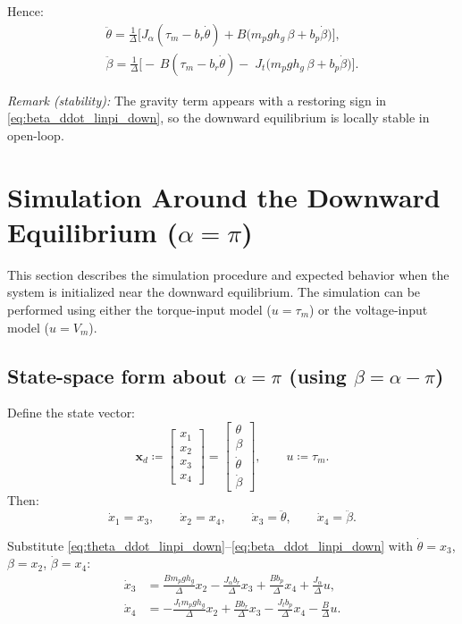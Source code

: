 \documentclass[12pt,a4paper]{article}
\begin{document}
Hence:
\begin{align}
\boxed{
\ddot\theta
=
\frac{1}{\Delta}\Big[
J_\alpha(\tau_m-b_r\dot\theta)
+
B\big(m_p g h_g\,\beta + b_p\dot\beta\big)
\Big],
}
\label{eq:theta_ddot_linpi_down}\\[6pt]
\boxed{
\ddot\beta
=
\frac{1}{\Delta}\Big[
-\,B(\tau_m-b_r\dot\theta)
-\;J_t\big(m_p g h_g\,\beta + b_p\dot\beta\big)
\Big].
}
\label{eq:beta_ddot_linpi_down}
\end{align}

\noindent\textit{Remark (stability):}
The gravity term appears with a restoring sign in \eqref{eq:beta_ddot_linpi_down}, so the downward equilibrium is locally stable in open-loop.

\section{Simulation Around the Downward Equilibrium ($\alpha=\pi$)}

This section describes the simulation procedure and expected behavior when the system is initialized near the downward equilibrium. The simulation can be performed using either the torque-input model ($u=\tau_m$) or the voltage-input model ($u=V_m$).

\subsection{State-space form about $\alpha=\pi$ (using $\beta=\alpha-\pi$)}

Define the state vector:
\[
\bm x_d \coloneqq
\begin{bmatrix}
x_1\\x_2\\x_3\\x_4
\end{bmatrix}
=
\begin{bmatrix}
\theta\\ \beta\\ \dot\theta\\ \dot\beta
\end{bmatrix},
\qquad
u\coloneqq\tau_m.
\]
Then:
\[
\dot x_1=x_3,\qquad \dot x_2=x_4,
\qquad
\dot x_3=\ddot\theta,\qquad \dot x_4=\ddot\beta.
\]

Substitute \eqref{eq:theta_ddot_linpi_down}--\eqref{eq:beta_ddot_linpi_down} with
$\dot\theta=x_3$, $\beta=x_2$, $\dot\beta=x_4$:
\begin{align*}
\dot x_3 &=
\frac{B m_p g h_g}{\Delta}x_2
-\frac{J_\alpha b_r}{\Delta}x_3
+\frac{B b_p}{\Delta}x_4
+\frac{J_\alpha}{\Delta}u,\\[4pt]
\dot x_4 &=
-\frac{J_t m_p g h_g}{\Delta}x_2
+\frac{B b_r}{\Delta}x_3
-\frac{J_t b_p}{\Delta}x_4
-\frac{B}{\Delta}u.
\end{align*}
\end{document}
